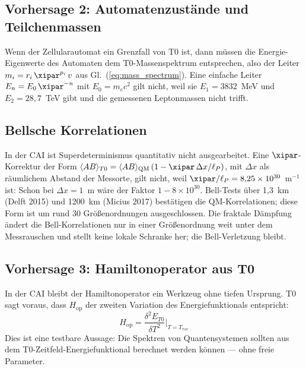 \subsection{Vorhersage 2: Automatenzustände und Teilchenmassen}

Wenn der Zellularautomat ein Grenzfall von T0 ist, dann müssen die
Energie-Eigenwerte des Automaten dem T0-Massenspektrum entsprechen, also der
Leiter $m_i = r_i\,\xipar^{p_i}\,v$ aus Gl.~(\ref{eq:mass_spectrum}). Eine einfache
Leiter $E_n = E_0\,\xipar^{-n}$ mit $E_0 = m_ec^2$ gilt nicht, weil sie
$E_1 = 3832$~MeV und $E_2 = 28{,}7$~TeV gibt und die gemessenen Leptonmassen nicht
trifft.

\subsection{Bellsche Korrelationen}

In der CAI ist Superdeterminismus quantitativ nicht ausgearbeitet. Eine
$\xipar$-Korrektur der Form
$\langle AB \rangle_{T0} = \langle AB \rangle_{\text{QM}}\,(1 - \xipar\,\Delta x/\ell_P)$,
mit $\Delta x$ als räumlichem Abstand der Messorte, gilt nicht, weil
$\xipar/\ell_P = 8{,}25\times10^{30}$~m$^{-1}$ ist: Schon bei $\Delta x = 1$~m wäre der
Faktor $1 - 8\times10^{30}$. Bell-Tests über 1,3~km (Delft 2015) und 1200~km
(Micius 2017) bestätigen die QM-Korrelationen; diese Form ist um rund
30 Größenordnungen ausgeschlossen. Die fraktale Dämpfung ändert die
Bell-Korrelationen nur in einer Größenordnung weit unter dem Messrauschen und stellt
keine lokale Schranke her; die Bell-Verletzung bleibt.

\subsection{Vorhersage 3: Hamiltonoperator aus T0}

In der CAI bleibt der Hamiltonoperator ein Werkzeug ohne tiefen Ursprung. T0
sagt voraus, dass $H_{\text{op}}$ der zweiten Variation des Energiefunktionals
entspricht:
\begin{equation}
    H_{\text{op}} = \frac{\delta^2 E_{T0}}{\delta T^2}
    \bigg|_{T = T_{\text{vac}}}
    \label{eq:hamilton_from_t0}
\end{equation}
Dies ist eine testbare Aussage: Die Spektren von Quantensystemen sollten aus
dem T0-Zeitfeld-Energiefunktional berechnet werden können — ohne freie Parameter.

\clearpage


